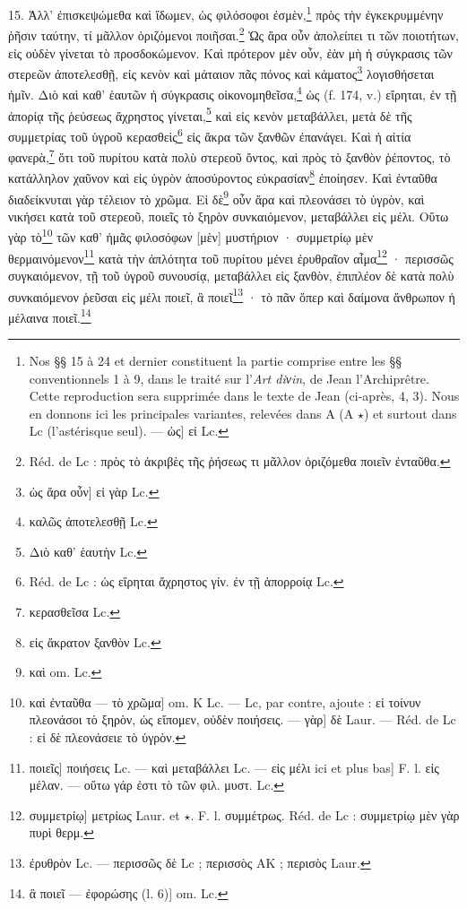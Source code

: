 \documentclass[landscape, a4paper, 11pt, oneside, polutonikogreek, french]{article}
\begin{document}
15. Ἀλλ' ἐπισκεψώμεθα καὶ ἴδωμεν, ὡς φιλόσοφοι ἐσμὲν,\footnote{Nos §§ 15 à 24 et dernier constituent la partie comprise entre les §§ conventionnels 1 à 9, dans le traité sur l'\emph{Art diνin}, de Jean l'Archiprêtre. Cette reproduction sera supprimée dans le texte de Jean (ci-après, 4, 3). Nous en donnons ici les principales variantes, relevées dans A (A $\star$) et surtout dans Lc (l'astérisque seul). --- ὡς] εἰ Lc.} πρὸς τὴν ἐγκεκρυμμένην ῥῆσιν ταύτην, τί μᾶλλον ὁριζόμενοι ποιῆσαι.\footnote{Réd. de Lc : πρὸς τὸ ἀκριβὲς τῆς ῥήσεως τι μᾶλλον ὀριζόμεθα ποιεῖν ἐνταῦθα.} Ὡς ἄρα οὖν ἀπολείπει τι τῶν ποιοτήτων, εἰς οὐδὲν γίνεται τὸ προσδοκώμενον. Καὶ πρότερον μὲν οὖν, ἐὰν μὴ ἡ σύγκρασις τῶν στερεῶν ἀποτελεσθῇ, εἰς κενὸν καὶ μάταιον πᾶς πόνος καὶ κάματος\footnote{ὡς ἄρα οὖν] εἰ γὰρ Lc.} λογισθήσεται ἡμῖν. Διὸ καὶ καθ' ἑαυτῶν ἠ σύγκρασις οἰκονομηθεῖσα,\footnote{καλῶς ἀποτελεσθῇ Lc.} ὡς (f. 174, v.) εἴρηται, ἐν τῇ ἀπορίᾳ τῆς ῥεύσεως ἄχρηστος γίνεται,\footnote{Διὸ καθ' ἑαυτὴν Lc.} καὶ εἰς κενὸν μεταβάλλει, μετὰ δὲ τῆς συμμετρίας τοῦ ὑγροῦ κερασθεὶς\footnote{Réd. de Lc : ὡς εἴρηται ἄχρηστος γίν. ἐν τῇ ἀπορροίᾳ Lc.} εἰς ἄκρα τῶν ξανθῶν ἐπανάγει. Καὶ ἠ αἰτία φανερὰ,\footnote{κερασθεῖσα Lc.} ὅτι τοῦ πυρίτου κατὰ πολὺ στερεοῦ ὄντος, καὶ πρὸς τὸ ξανθὸν ῥέποντος, τὸ κατάλληλον χαῦνον καὶ εἰς ὑγρὸν ἀποσύροντος εὐκρασίαν\footnote{εἰς ἄκρατον ξανθὸν Lc.} ἐποίησεν. Καὶ ἐνταῦθα διαδείκνυται γὰρ τέλειον τὸ χρῶμα. Εἰ δὲ\footnote{καὶ om. Lc.} οὖν ἄρα καὶ πλεονάσει τὸ ὑγρὸν, καὶ νικήσει κατὰ τοῦ στερεοῦ, ποιεῖς τὸ ξηρὸν συνκαιόμενον, μεταβάλλει εἰς μέλι. Οὕτω γὰρ τὸ\footnote{καὶ ἐνταῦθα --- τὸ χρῶμα] om. K Lc. --- Lc, par contre, ajoute : εἰ τοίνυν πλεονάσοι τὸ ξηρὸν, ὡς εἴπομεν, οὐδὲν ποιήσεις. --- γὰρ] δὲ Laur. --- Réd. de Lc : εἰ δὲ πλεονάσειε τὸ ὑγρὸν.} τῶν καθ' ἡμᾶς φιλοσόφων [μὲν] μυστήριον · συμμετρίῳ μὲν θερμαινόμενον\footnote{ποιεῖς] ποιήσεις Lc. --- καὶ μεταβάλλει Lc. --- εἰς μέλι ici et plus bas] F. l. εἰς μέλαν. --- οὕτω γάρ ἐστι τὸ τῶν φιλ. μυστ. Lc.} κατὰ τὴν ἀπλότητα τοῦ πυρίτου μένει ἐρυθραῖον αἷμα\footnote{συμμετρίῳ] μετρίως Laur. et $\star$. F. l. συμμέτρως. Réd. de Lc : συμμετρίῳ μὲν γὰρ πυρὶ θερμ.} · περισσῶς συγκαιόμενον, τῇ τοῦ ὑγροῦ συνουσίᾳ, μεταβάλλει εἰς ξανθὸν, ἐπιπλέον δὲ κατὰ πολὺ συνκαιόμενον ῥεῦσαι εἰς μέλι ποιεῖ, ἃ ποιεῖ\footnote{ἐρυθρὸν Lc. --- περισσῶς δὲ Lc ; περισσὸς AK ; περισὸς Laur.} · τὸ πᾶν ὅπερ καὶ δαίμονα ἄνθρωπον ἡ μέλαινα ποιεῖ.\footnote{ἃ ποιεῖ --- ἐφορώσης (l. 6)] om. Lc.}
\end{document}
